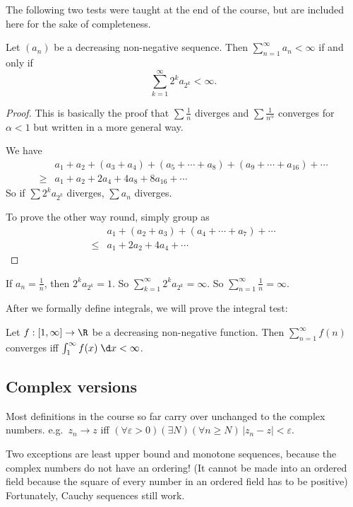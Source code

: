 \documentclass[a4paper]{article}
\begin{document}
The following two tests were taught at the end of the course, but are included here for the sake of completeness.
\begin{thm}
  Let $(a_n)$ be a decreasing non-negative sequence. Then $\sum_{n = 1}^\infty a_n < \infty$ if and only if
  \[
    \sum_{k = 1}^\infty 2^k a_{2^k} < \infty.
  \]
\end{thm}

\begin{proof}
  This is basically the proof that $\sum \frac{1}{n}$ diverges and $\sum \frac{1}{n^{\alpha}}$ converges for $\alpha < 1$ but written in a more general way.

  We have
  \begin{align*}
    &a_1 + a_2 + (a_3 + a_4) + (a_5 + \cdots + a_8) + (a_9 + \cdots + a_{16}) + \cdots\\
    \geq & a_1 + a_2 + 2a_4 + 4a_8 + 8 a_{16} + \cdots
  \end{align*}
  So if $\sum 2^k a_{2^k}$ diverges, $\sum a_n$ diverges.

  To prove the other way round, simply group as
  \begin{align*}
    & a_1 + (a_2 + a_3) + (a_4 + \cdots + a_7) + \cdots\\
    \leq & a_1 + 2a_2 + 4a_4 + \cdots
  \end{align*}
\end{proof}

\begin{eg}
  If $a_n = \frac{1}{n}$, then $2^k a_{2^k} = 1$. So $\sum_{k = 1}^\infty 2^k a_{2^k} = \infty$. So $\sum_{n = 1}^\infty \frac{1}{n} = \infty$.
\end{eg}

After we formally define integrals, we will prove the integral test:
\begin{thm}
  Let $f: [1, \infty] \to \R$ be a decreasing non-negative function. Then $\sum_{n = 1}^\infty f(n)$ converges iff $\int_1^\infty f(x)\;\d x < \infty$.
\end{thm}

\subsection{Complex versions}
Most definitions in the course so far carry over unchanged to the complex numbers. e.g.\ $z_n \to z$ iff $(\forall \varepsilon > 0)(\exists N)(\forall n\geq N)\, |z_n - z| < \varepsilon$.

Two exceptions are least upper bound and monotone sequences, because the complex numbers do not have an ordering! (It cannot be made into an ordered field because the square of every number in an ordered field has to be positive) Fortunately, Cauchy sequences still work.
\end{document}
